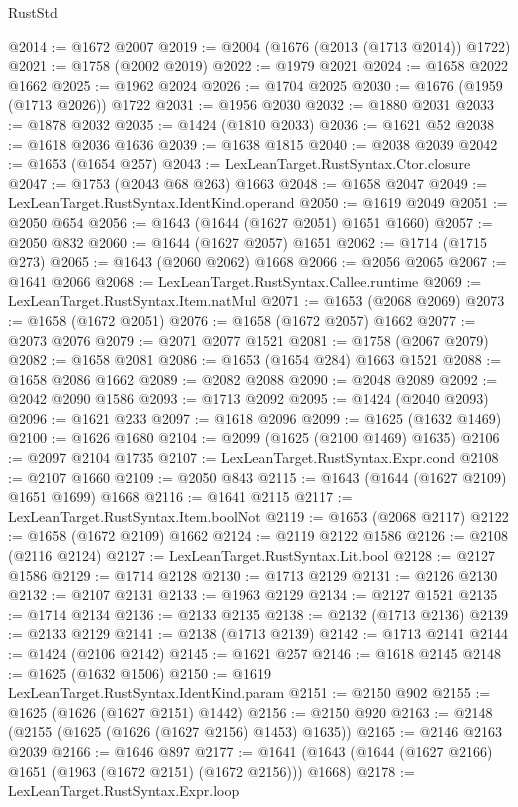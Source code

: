 \begin{lexlean}{RustStd}
\begin{coremodule}
@2014 := @1672 @2007
@2019 := @2004 (@1676 (@2013 (@1713 @2014)) @1722)
@2021 := @1758 (@2002 @2019)
@2022 := @1979 @2021
@2024 := @1658 @2022 @1662
@2025 := @1962 @2024
@2026 := @1704 @2025
@2030 := @1676 (@1959 (@1713 @2026)) @1722
@2031 := @1956 @2030
@2032 := @1880 @2031
@2033 := @1878 @2032
@2035 := @1424 (@1810 @2033)
@2036 := @1621 @52
@2038 := @1618 @2036 @1636
@2039 := @1638 @1815
@2040 := @2038 @2039
@2042 := @1653 (@1654 @257)
@2043 := LexLeanTarget.RustSyntax.Ctor.closure
@2047 := @1753 (@2043 @68 @263) @1663
@2048 := @1658 @2047
@2049 := LexLeanTarget.RustSyntax.IdentKind.operand
@2050 := @1619 @2049
@2051 := @2050 @654
@2056 := @1643 (@1644 (@1627 @2051) @1651 @1660)
@2057 := @2050 @832
@2060 := @1644 (@1627 @2057) @1651
@2062 := @1714 (@1715 @273)
@2065 := @1643 (@2060 @2062) @1668
@2066 := @2056 @2065
@2067 := @1641 @2066
@2068 := LexLeanTarget.RustSyntax.Callee.runtime
@2069 := LexLeanTarget.RustSyntax.Item.natMul
@2071 := @1653 (@2068 @2069)
@2073 := @1658 (@1672 @2051)
@2076 := @1658 (@1672 @2057) @1662
@2077 := @2073 @2076
@2079 := @2071 @2077 @1521
@2081 := @1758 (@2067 @2079)
@2082 := @1658 @2081
@2086 := @1653 (@1654 @284) @1663 @1521
@2088 := @1658 @2086 @1662
@2089 := @2082 @2088
@2090 := @2048 @2089
@2092 := @2042 @2090 @1586
@2093 := @1713 @2092
@2095 := @1424 (@2040 @2093)
@2096 := @1621 @233
@2097 := @1618 @2096
@2099 := @1625 (@1632 @1469)
@2100 := @1626 @1680
@2104 := @2099 (@1625 (@2100 @1469) @1635)
@2106 := @2097 @2104 @1735
@2107 := LexLeanTarget.RustSyntax.Expr.cond
@2108 := @2107 @1660
@2109 := @2050 @843
@2115 := @1643 (@1644 (@1627 @2109) @1651 @1699) @1668
@2116 := @1641 @2115
@2117 := LexLeanTarget.RustSyntax.Item.boolNot
@2119 := @1653 (@2068 @2117)
@2122 := @1658 (@1672 @2109) @1662
@2124 := @2119 @2122 @1586
@2126 := @2108 (@2116 @2124)
@2127 := LexLeanTarget.RustSyntax.Lit.bool
@2128 := @2127 @1586
@2129 := @1714 @2128
@2130 := @1713 @2129
@2131 := @2126 @2130
@2132 := @2107 @2131
@2133 := @1963 @2129
@2134 := @2127 @1521
@2135 := @1714 @2134
@2136 := @2133 @2135
@2138 := @2132 (@1713 @2136)
@2139 := @2133 @2129
@2141 := @2138 (@1713 @2139)
@2142 := @1713 @2141
@2144 := @1424 (@2106 @2142)
@2145 := @1621 @257
@2146 := @1618 @2145
@2148 := @1625 (@1632 @1506)
@2150 := @1619 LexLeanTarget.RustSyntax.IdentKind.param
@2151 := @2150 @902
@2155 := @1625 (@1626 (@1627 @2151) @1442)
@2156 := @2150 @920
@2163 := @2148 (@2155 (@1625 (@1626 (@1627 @2156) @1453) @1635))
@2165 := @2146 @2163 @2039
@2166 := @1646 @897
@2177 := @1641 (@1643 (@1644 (@1627 @2166) @1651 (@1963 (@1672 @2151) (@1672 @2156))) @1668)
@2178 := LexLeanTarget.RustSyntax.Expr.loop

\end{coremodule}
\end{lexlean}
